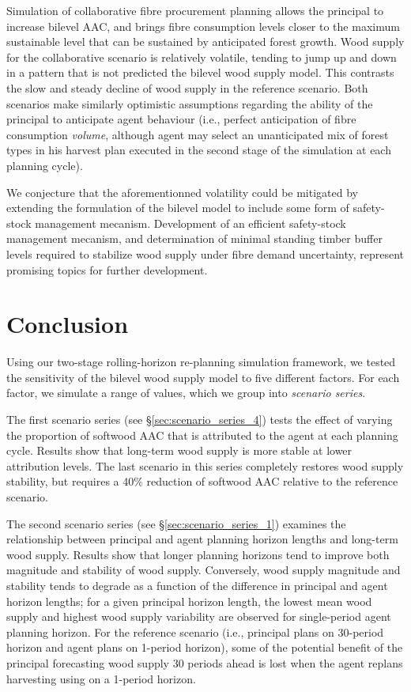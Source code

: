 Simulation of collaborative fibre procurement planning allows the principal to increase bilevel AAC, and brings fibre consumption levels closer to the maximum sustainable level that can be sustained by anticipated forest growth. Wood supply for the collaborative scenario is relatively volatile, tending to jump up and down in a pattern that is not predicted the bilevel wood supply model. This contrasts the slow and steady decline of wood supply in the reference scenario. Both scenarios make similarly optimistic assumptions regarding the ability of the principal to anticipate agent behaviour (i.e., perfect anticipation of fibre consumption \emph{volume}, although agent may select an unanticipated mix of forest types in his harvest plan executed in the second stage of the simulation at each planning cycle). 

We conjecture that the aforementionned volatility could be mitigated by extending the formulation of the bilevel model to include some form of safety-stock management mecanism. Development of an efficient safety-stock management mecanism, and determination of minimal standing timber buffer levels required to stabilize wood supply under fibre demand uncertainty, represent promising topics for further development.


\section{Conclusion}

Using our two-stage rolling-horizon re-planning simulation framework, we tested the sensitivity of the bilevel wood supply model to five different factors. For each factor, we simulate a range of values, which we group into \emph{scenario series}. 

The first scenario series (see \S\ref{sec:scenario_series_4}) tests the effect of varying the proportion of softwood AAC that is attributed to the agent at each planning cycle. Results show that long-term wood supply is more stable at lower attribution levels. The last scenario in this series completely restores wood supply stability, but requires a 40\% reduction of softwood AAC relative to the reference scenario. 

The second scenario series (see \S\ref{sec:scenario_series_1}) examines the relationship between principal and agent planning horizon lengths and long-term wood supply. Results show that longer planning horizons tend to improve both magnitude and stability of wood supply. Conversely, wood supply magnitude and stability tends to degrade as a function of the difference in principal and agent horizon lengths; for a given principal horizon length, the lowest mean wood supply and highest wood supply variability are observed for single-period agent planning horizon. For the reference scenario (i.e., principal plans on 30-period horizon and agent plans on 1-period horizon), some of the potential benefit of the principal forecasting wood supply 30 periods ahead is lost when the agent replans harvesting using on a 1-period horizon. 


